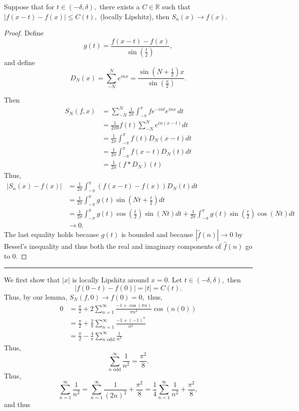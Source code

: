 \documentclass[11pt]{article}
\newcommand{\bbR}{\mathbb{R}}
\begin{document}
\begin{problem}
\begin{enumerate}
\begin{solution}
\begin{lemma}
    Suppose that for $t\in (-\delta, \delta),$ there exists a $C\in \bbR$ such that $|f(x-t) - f(x)|\leq C(t),$ (locally Lipshitz), then $S_n(x)\to f(x).$
\end{lemma}
\begin{proof}
    Define 
    \[g(t) = \frac{f(x-t) - f(x)}{\sin(\frac{t}{2})},\] and define
    \[D_N(x) = \sum_{-N}^N e^{inx} = \frac{\sin(N + \frac{1}{2})x}{\sin(\frac{x}{2})}.\]

    Then 
     \begin{align*}
     S_N(f,x) &= \sum_{-N}^N \frac{1}{2\pi}\int_{-\pi}^\pi f e^{-int} e^{inx}\,dt\\
     &= \frac{1}{2\pi0}f(t)\sum_{-N}^N e^{in(x-t)}dt\\
     &= \frac{1}{2\pi}\int_{-\pi}^\pi f(t)D_N(x-t)dt\\
     &= \frac{1}{2\pi}\int_{-\pi}^\pi f(x-t)D_N(t)dt\\
     &= \frac{1}{2\pi}(f \ast D_N)(t)
 \end{align*}
Thus,
    \begin{align*}
        |S_n(x) - f(x)| &= \frac{1}{2\pi}\int_{-\pi}^\pi (f(x-t) - f(x))D_N(t)dt\\
        &= \frac{1}{2\pi}\int_{-\pi}^\pi g(t)\sin(Nt + \frac{t}{2})dt\\
        &= \frac{1}{2\pi}\int_{-\pi}^\pi g(t)\cos(\frac{t}{2})\sin(Nt)dt + \frac{1}{2\pi}\int_{-\pi}^\pi g(t)\sin(\frac{t}{2})\cos(Nt)dt\\
        &\to 0.
    \end{align*}
    The last equality holds because $g(t)$ is bounded and because $|\hat{f}(n)|\to 0$ by Bessel's inequality and thus both the real and imaginary components of $\hat{f}(n)$ go to $0.$
\end{proof}
\rule{\linewidth}{0.4pt}
We first show that $|x|$ is locally Lipshitz around $x = 0.$ Let $t\in (-\delta, \delta),$ then 
\[|f(0 - t) - f(0)| = |t|  = C(t).\]Thus, by our lemma, $S_N(f,0)\to f(0) = 0,$ thus, 
\begin{align*}
0 &= \frac{\pi}{2} + 2\sum_{n=1}^\infty \frac{-1 + \cos(\pi n)}{\pi n^2}\cos(n (0))\\
&= \frac{\pi}{2} + \frac{2}{\pi}\sum_{n=1}^\infty \frac{-1 + (-1)^n}{n^2}\\
&= \frac{\pi}{2} - \frac{4}{\pi}\sum_{n \text{ odd}}^\infty \frac{1}{n^2}
\end{align*}
Thus, \[\sum_{n \text{ odd}}^\infty \frac{1}{n^2} = \frac{\pi^2}{8}.\] Thus, 
\[\sum_{n=1}^\infty \frac{1}{n^2}= \sum_{n=1}^\infty \frac{1}{(2n)^2} + \frac{\pi^2}{8} = \frac{1}{4}\sum_{n=1}^\infty \frac{1}{n^2} + \frac{\pi^2}{8},\] and thus 

\end{solution}
\end{enumerate}
\end{problem}
\end{document}
